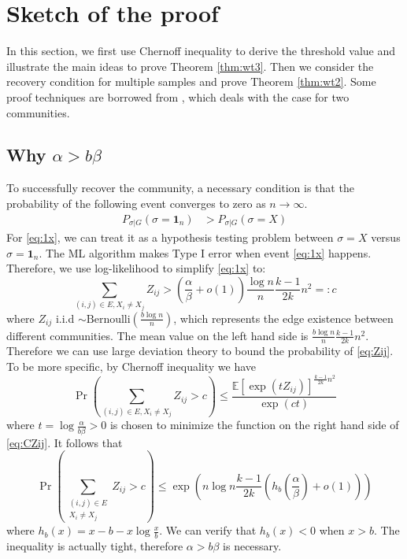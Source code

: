 \documentclass[conference]{IEEEtran}
\begin{document}
\section{Sketch of the proof}
\label{sect:sketch}

In this section, we first use Chernoff inequality to derive the threshold value and illustrate the main ideas to prove Theorem \ref{thm:wt3}.
Then we consider the recovery condition for multiple samples and prove Theorem \ref{thm:wt2}.
Some proof techniques are borrowed from \cite{ye2020exact}, which deals with the case for two communities.

\subsection{Why $\alpha > b \beta$}
To successfully recover the community, a necessary condition is that the probability of the following event converges to zero as $n\to\infty$.
\begin{align}
P_{\sigma | G}(\sigma =  \mathbf{1}_n) & > P_{\sigma | G}(\sigma = X) \label{eq:1x}
\end{align}
For \eqref{eq:1x}, we can treat it as a hypothesis testing problem between $\sigma = X$ versus $\sigma = \mathbf{1}_n$.
The ML algorithm makes Type I error when event \eqref{eq:1x} happens. Therefore, we use log-likelihood to simplify
\eqref{eq:1x} to:
\begin{equation}\label{eq:Zij}
\sum_{(i,j)\in E, X_i \neq X_j} Z_{ij} > (\frac{\alpha}{\beta} + o(1)) \frac{\log n}{n} \frac{k-1}{2k}n^2 =: c
\end{equation}
where $Z_{ij}$ i.i.d $\sim \textrm{Bernoulli}(\frac{b\log n }{n})$, which represents the edge existence between different communities. The mean value on the left hand side is $\frac{b \log n }{n} \frac{k-1}{2k}n^2$. Therefore we can use large
deviation theory to bound the probability of \eqref{eq:Zij}. To be more specific, by Chernoff inequality we have
\begin{equation}\label{eq:CZij}
\Pr\left(\sum_{(i,j)\in E, X_i \neq X_j} Z_{ij} >  c \right)\leq \frac{\mathbb{E}[\exp(t Z_{ij})]^{ \frac{k-1}{2k}n^2 }}{\exp(ct)}
\end{equation}
where $ t  = \log \frac{\alpha}{b\beta} > 0$ is chosen to minimize the function on the right hand side of \eqref{eq:CZij}. It follows that
\begin{equation}\label{eq:nlogn}
\Pr(\sum_{\substack{(i,j)\in E \\ X_i \neq X_j}} Z_{ij} >  c )\leq \exp(n\log n  \frac{k-1}{2k} (h_b(\frac{\alpha}{\beta}) + o(1)))
\end{equation}
where $h_b(x) = x - b - x \log\frac{x}{b}$. We can verify that $h_b(x) < 0 $ when $ x > b$. The inequality is actually tight,
therefore $\alpha > b \beta$
is necessary.
\end{document}
